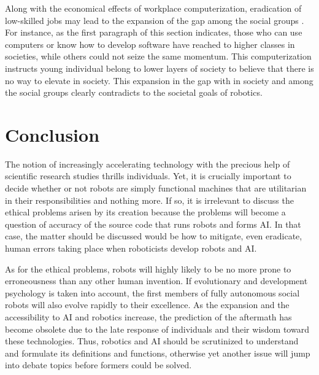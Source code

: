 \documentclass[man]{apa6}
\begin{document}
Along with the economical effects of workplace computerization, eradication of low-skilled jobs may lead to the expansion of the gap among the social groups \cite{gre}.
For instance, as the first paragraph of this section indicates, those who can use computers or know how to develop software have reached to higher classes in societies, while others could not seize the same momentum.
This computerization instructs young individual belong to lower layers of society to believe that there is no way to elevate in society.
This expansion in the gap with in society and among the social groups clearly contradicts to the societal goals of robotics.

\section{Conclusion}
The notion of increasingly accelerating technology with the precious help of scientific research studies thrills individuals.
Yet, it is crucially important to decide whether or not robots are simply functional machines that are utilitarian in their responsibilities and nothing more.
If so, it is irrelevant to discuss the ethical problems arisen by its creation because the problems will become a question of accuracy of the source code that runs robots and forms AI.
In that case, the matter should be discussed would be how to mitigate, even eradicate, human errors taking place when roboticists develop robots and AI. \par
As for the ethical problems, robots will highly likely to be no more prone to erroneousness than any other human invention.
If evolutionary and development psychology is taken into account, the first members of fully autonomous social robots will also evolve rapidly to their excellence.
As the expansion and the accessibility to AI and robotics increase, the prediction of the aftermath has become obsolete due to the late response of individuals and their wisdom toward these technologies.
Thus, robotics and AI should be scrutinized to understand and formulate its definitions and functions, otherwise yet another issue will jump into debate topics before formers could be solved.


\end{document}
